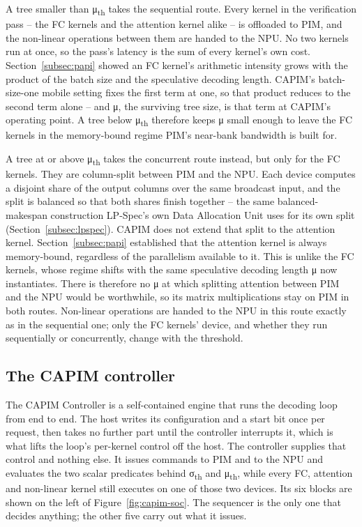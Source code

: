 \documentclass[11pt]{article}
\begin{document}
A tree smaller than μ\textsubscript{th} takes the sequential route. Every kernel in the verification pass -- the FC kernels and the attention kernel alike -- is offloaded to PIM, and the non-linear operations between them are handed to the NPU. No two kernels run at once, so the pass's latency is the sum of every kernel's own cost. Section~\ref{subsec:papi} showed an FC kernel's arithmetic intensity grows with the product of the batch size and the speculative decoding length. CAPIM's batch-size-one mobile setting fixes the first term at one, so that product reduces to the second term alone -- and μ, the surviving tree size, is that term at CAPIM's operating point. A tree below μ\textsubscript{th} therefore keeps μ small enough to leave the FC kernels in the memory-bound regime PIM's near-bank bandwidth is built for.

A tree at or above μ\textsubscript{th} takes the concurrent route instead, but only for the FC kernels. They are column-split between PIM and the NPU. Each device computes a disjoint share of the output columns over the same broadcast input, and the split is balanced so that both shares finish together -- the same balanced-makespan construction LP-Spec's own Data Allocation Unit uses for its own split (Section~\ref{subsec:lpspec}). CAPIM does not extend that split to the attention kernel. Section~\ref{subsec:papi} established that the attention kernel is always memory-bound, regardless of the parallelism available to it. This is unlike the FC kernels, whose regime shifts with the same speculative decoding length μ now instantiates. There is therefore no μ at which splitting attention between PIM and the NPU would be worthwhile, so its matrix multiplications stay on PIM in both routes. Non-linear operations are handed to the NPU in this route exactly as in the sequential one; only the FC kernels' device, and whether they run sequentially or concurrently, change with the threshold.

\subsection{The CAPIM controller}
\label{sec:controller}
The CAPIM Controller is a self-contained engine that runs the decoding loop from end to end. The host writes its configuration and a start bit once per request, then takes no further part until the controller interrupts it, which is what lifts the loop's per-kernel control off the host. The controller supplies that control and nothing else. It issues commands to PIM and to the NPU and evaluates the two scalar predicates behind σ\textsubscript{th} and μ\textsubscript{th}, while every FC, attention and non-linear kernel still executes on one of those two devices. Its six blocks are shown on the left of Figure~\ref{fig:capim-soc}. The sequencer is the only one that decides anything; the other five carry out what it issues.
\end{document}
